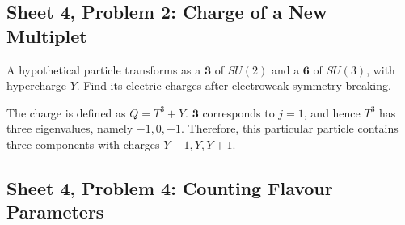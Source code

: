 \subsection{Sheet 4, Problem 2: Charge of a New Multiplet}

A hypothetical particle transforms as a $\mathbf3$ of $SU(2)$
and a $\mathbf6$ of $SU(3)$, with hypercharge $Y$.
Find its electric charges after electroweak symmetry breaking.

\begin{solution}
    The charge is defined as $Q = T^3 + Y$. $\mathbf{3}$ corresponds to $j=1$, and hence $T^3$ has three eigenvalues, namely $-1,0,+1$. Therefore, this particular particle contains three components with charges $Y-1, Y, Y+1$.
\end{solution}

\subsection{Sheet 4, Problem 4: Counting Flavour Parameters}

